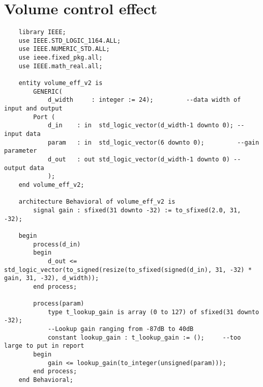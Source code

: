 \section*{Volume control effect}
\begin{lstlisting}
    library IEEE;
    use IEEE.STD_LOGIC_1164.ALL;
    use IEEE.NUMERIC_STD.ALL;
    use ieee.fixed_pkg.all;
    use IEEE.math_real.all;
    
    entity volume_eff_v2 is
        GENERIC(
            d_width     : integer := 24);         --data width of input and output
        Port ( 
            d_in    : in  std_logic_vector(d_width-1 downto 0); --input data
            param   : in  std_logic_vector(6 downto 0);         --gain parameter
            d_out   : out std_logic_vector(d_width-1 downto 0) --output data
            ); 
    end volume_eff_v2;
    
    architecture Behavioral of volume_eff_v2 is
        signal gain : sfixed(31 downto -32) := to_sfixed(2.0, 31, -32);
    
    begin
        process(d_in)
        begin
            d_out <= std_logic_vector(to_signed(resize(to_sfixed(signed(d_in), 31, -32) * gain, 31, -32), d_width));
        end process;
    
        process(param)
            type t_lookup_gain is array (0 to 127) of sfixed(31 downto -32);
            --Lookup gain ranging from -87dB to 40dB
            constant lookup_gain : t_lookup_gain := ();     --too large to put in report
        begin
            gain <= lookup_gain(to_integer(unsigned(param)));
        end process;
    end Behavioral;
\end{lstlisting}

